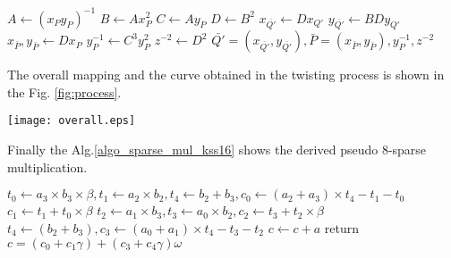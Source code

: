 \begin{algorithm}[H]
	\caption{Pre-calculation and mapping $P \mapsto\bar{P}$ and $Q'\mapsto \bar{Q'}$}
	\label{pre_calc_Algo}
	\DontPrintSemicolon
	\hspace{-3ex}
\hspace{-3ex}
	
	\nl $A \leftarrow (x_Py_P)^{-1}$\;
    \nl $B \leftarrow Ax_P^{2}$\;
    \nl $C \leftarrow Ay_P$\;
    \nl $D \leftarrow B^2$\;
    \nl $x_{\bar{Q'}} \leftarrow Dx_{Q'}$\;
    \nl $y_{\bar{Q'}} \leftarrow BDy_{Q'}$\;
    \nl $x_{\bar{P}}, y_{\bar{P}} \leftarrow Dx_P$\;
    \nl $y_P^{-1} \leftarrow C^3y_{P}^2$\;
    \nl $z^{-2} \leftarrow D^2$\;
	 $\bar{Q'}=(x_{\bar{Q'}},y_{\bar{Q'}}),\bar{P} = (x_{\bar{P}}, y_{\bar{P}}), y_{P}^{-1}, z^{-2}$\;
\end{algorithm}
\vspace{-0.6em}

The overall mapping  and the curve obtained in the twisting process is shown in the Fig. \ref{fig:process}.
\begin{figure*}
\centering
\texttt{[image: overall.eps]}
\caption{ Overview of the twisting process to get pseudo sparse form in KSS-16 curve.}
\label{fig:process}
\end{figure*}

Finally the Alg.\ref{algo_sparse_mul_kss16} shows the derived pseudo 8-sparse multiplication.
\begin{algorithm}[htbp]
	\caption{Pseudo 8-sparse multiplication for KSS-16 curve}
	\label{algo_sparse_mul_kss16}
	\DontPrintSemicolon
	\hspace{-3ex}
	\hspace{-3ex}
	\nl $t_0 \leftarrow a_3 \times b_3 \times \beta, t_1 \leftarrow a_2\times b_2,  t_4\leftarrow b_2+b_3, c_0 \leftarrow (a_2+a_3) \times t_4-t_1-t_0$\;
	\nl $c_1\leftarrow t_1+ t_0 \times \beta$\;
	\nl $t_2\leftarrow a_1\times b_3 ,t_3\leftarrow a_0\times b_2, c_2\leftarrow t_3+t_2 \times \beta$\;
	\nl $t_4\leftarrow (b_2+b_3), c_3 \leftarrow (a_0+a_1)\times t_4-t_3 - t_2 $\;
	\nl $c\leftarrow c+a$\;
	\nl return $c=(c_0+c_1\gamma)+(c_3+c_4\gamma)\omega$
\end{algorithm}
\vspace{-0.6em}

